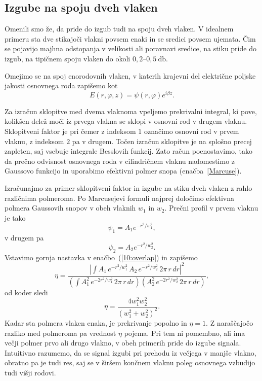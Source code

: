 \subsection*{Izgube na spoju dveh vlaken}
Omenili smo že, da pride do izgub tudi na spoju dveh vlaken. 
V idealnem primeru sta dve stikajoči vlakni povsem enaki in se sredici povsem ujemata. 
Čim se pojavijo majhna odstopanja v velikosti ali poravnavi sredice, na stiku pride 
do izgub, na tipičnem spoju vlaken do okoli $0,2$--$0,5~\si{\decibel}$.

Omejimo se na spoj enorodovnih vlaken, v katerih krajevni del 
električne poljske jakosti osnovnega roda zapišemo kot
\begin{equation}
E(r, \varphi, z)=\psi(r, \varphi) e^{i\beta z}.
\end{equation} 

Za izračun sklopitve med dvema vlaknoma vpeljemo prekrivalni integral,
ki pove, kolikšen delež moči iz prvega vlakna 
se sklopi v osnovni rod v drugem vlaknu. Sklopitveni faktor je
pri čemer z indeksom $1$ označimo osnovni rod v prvem vlaknu, z indeksom $2$ pa 
v drugem. Točen izračun sklopitve je na splošno precej zapleten, saj vsebuje integrale
Besslovih funkcij. Zato račun poenostavimo, tako 
da prečno odvisnost osnovnega roda v cilindričnem vlaknu nadomestimo z 
Gaussovo funkcijo in uporabimo efektivni polmer snopa (enačba~\ref{Marcuse}).

Izračunajmo za primer sklopitveni faktor in izgube na stiku dveh vlaken z rahlo 
različnima polmeroma. Po Marcusejevi formuli najprej določimo efektivna polmera Gaussovih snopov
v obeh vlaknih $w_1$ in $w_2$. Prečni profil v prvem vlaknu je tako
\begin{equation}
\psi_1 = A_1 e^{-r^2/w_1^2},
\end{equation}
v drugem pa 
\begin{equation}
\psi_2 = A_2 e^{-r^2/w_2^2}.
\end{equation}
Vstavimo gornja nastavka v enačbo~(\ref{10:overlap}) in zapišemo
\begin{equation}
\eta = \frac{|\int A_1 \, e^{-r^2/w_1^2}\, A_2\, e^{-r^2/w_2^2}\, 2 \pi\, r\, dr|^2}
{\left(\int A_1^2 \,e^{-2r^2/w_1^2} \, 2 \pi \, r\, dr \right) \left( A_2^2\, 
e^{-2r^2/w_2^2}\, 2 \pi \, r\, dr \right)},
\end{equation}
od koder sledi
\begin{equation}
\eta = \frac{4 w_1^2 w_2^2}{(w_1^2+w_2^2)^2}.
\end{equation}
Kadar sta polmera vlaken enaka, je prekrivanje popolno in $\eta = 1$. Z naraščajočo razliko
med polmeroma pa vrednost $\eta$ pojema. Pri tem
ni pomembno, ali ima večji polmer prvo ali drugo vlakno, v obeh primerih pride do izgube 
signala. Intuitivno razumemo, da se signal izgubi pri prehodu iz večjega v manjše vlakno, 
obratno pa je tudi res, saj se v širšem končnem vlaknu poleg osnovnega vzbudijo
tudi višji rodovi. 

